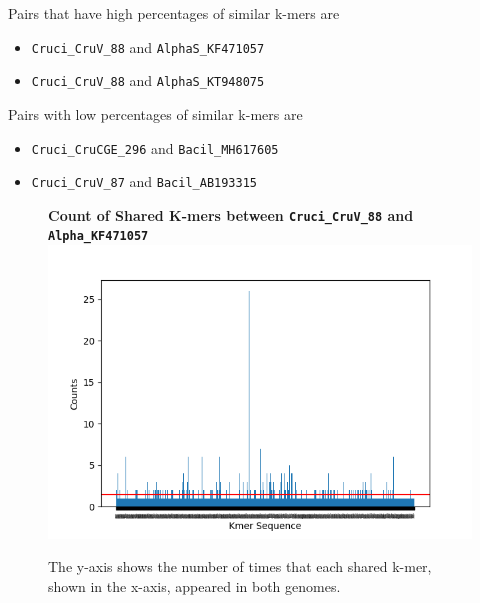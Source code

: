 \documentclass[eng]{ajceam-class}
\begin{document}
Pairs that have high percentages of similar k-mers are 
\begin{itemize}
    \item \texttt{Cruci\_CruV\_88} and \texttt{AlphaS\_KF471057}
    \item \texttt{Cruci\_CruV\_88} and \texttt{AlphaS\_KT948075}
\end{itemize}

Pairs with low percentages of similar k-mers are

\begin{itemize}
    \item \texttt{Cruci\_CruCGE\_296} and \texttt{Bacil\_MH617605}
    \item \texttt{Cruci\_CruV\_87} and \texttt{Bacil\_AB193315}
\end{itemize}

\begin{figure}
    \centering
    \textbf{Count of Shared K-mers between \texttt{Cruci\_CruV\_88} and \texttt{Alpha\_KF471057}}
    \includegraphics[scale = 0.5]{ComparisonBetweenCruci88DNAKF47105.png}
    \caption{The y-axis shows the number of times that each shared k-mer, shown in the x-axis, appeared in both genomes.}
\end{figure}
\end{document}
